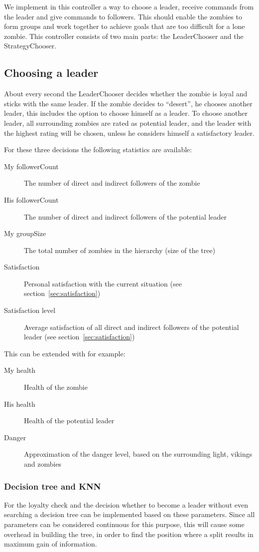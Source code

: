 We implement in this controller a way to choose a leader, receive commands from the leader and give commands to followers. This should enable the zombies to form groups and work together to achieve goals that are too difficult for a lone zombie. This controller consists of two main parts: the LeaderChooser and the StrategyChooser.

\subsection{Choosing a leader}
About every second the LeaderChooser decides whether the zombie is loyal and sticks with the same leader. If the zombie decides to ``desert'', he chooses another leader, this includes the option to choose himself as a leader. To choose another leader, all surrounding zombies are rated as potential leader, and the leader with the highest rating will be chosen, unless he considers himself a satisfactory leader.

For these three decisions the following statistics are available:
\begin{description}
 \item [My followerCount] The number of direct and indirect followers of the zombie
 \item [His followerCount] The number of direct and indirect followers of the potential leader
 \item [My groupSize] The total number of zombies in the hierarchy (size of the tree)
 \item [Satisfaction] Personal satisfaction with the current situation (see section~\ref{sec:satisfaction})
 \item [Satisfaction level] Average satisfaction of all direct and indirect followers of the potential leader (see section~\ref{sec:satisfaction})
\end{description}
This can be extended with for example:
\begin{description}
 \item [My health] Health of the zombie
 \item [His health] Health of the potential leader
 \item [Danger] Approximation of the danger level, based on the surrounding light, vikings and zombies
\end{description}

\subsubsection{Decision tree and KNN}
For the loyalty check and the decision whether to become a leader without even searching a decision tree can be implemented based on these parameters. Since all parameters can be considered continuous for this purpose, this will cause some overhead in building the tree, in order to find the position where a split results in maximum gain of information.

